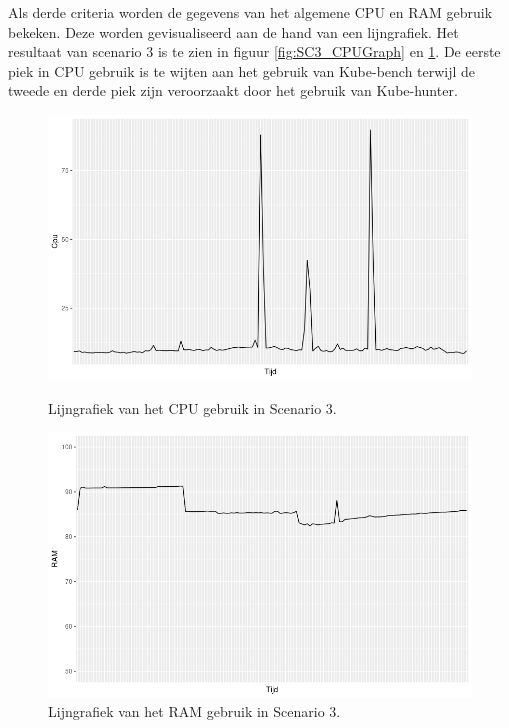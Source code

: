 Als derde criteria worden de gegevens van het algemene CPU en RAM gebruik bekeken. Deze worden gevisualiseerd aan de hand van een lijngrafiek. Het resultaat van scenario 3 is te zien in figuur \ref{fig:SC3_CPUGraph} en \ref{fig:SC3_RAMGraph}. De eerste piek in CPU gebruik is te wijten aan het gebruik van Kube-bench terwijl de tweede en derde piek zijn veroorzaakt door het gebruik van Kube-hunter.
\begin{figure}[h]
	\centering
	\begin{minipage}[h]{0.45\linewidth}
		\includegraphics[width=\linewidth]{img/SC3_CPUGraph.png}
		\caption{Lijngrafiek van het CPU gebruik in Scenario 3.}
		\label{fig:SC3_CPUGraph}
	\end{minipage}
	\quad
	\begin{minipage}[h]{0.45\linewidth}
		\includegraphics[width=\linewidth]{img/SC3_RAMGraph.png}
		\caption{Lijngrafiek van het RAM gebruik in Scenario 3.}
		\label{fig:SC3_RAMGraph}
	\end{minipage}
\end{figure}



